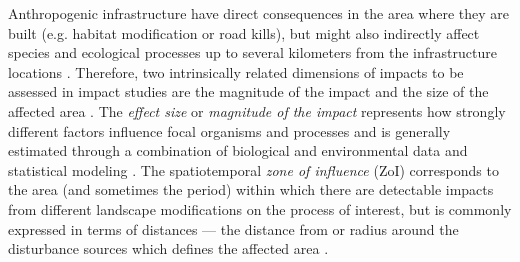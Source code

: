 \documentclass[titlepage]{article}
\begin{document}
Anthropogenic infrastructure have direct consequences in the area where they are built (e.g. habitat modification or road kills), but might also indirectly affect species and ecological processes up to several kilometers from the infrastructure locations \citep[e.g. reducing the probability of animal occurrence][]{johnson_cumulative_2005,torres_assessing_2016}. Therefore, two intrinsically related dimensions of impacts to be assessed in impact studies are the magnitude of the impact and the size of the affected area \citep[Box 1; ][]{naugle_unifying_2011}. The \textit{effect size} or \textit{magnitude of the impact} represents how strongly different factors influence focal organisms and processes and is generally estimated through a combination of biological and environmental data and statistical modeling \citep[Box 1;][]{polfus_identifying_2011}. The spatiotemporal \textit{zone of influence} (ZoI) 
corresponds to the area (and sometimes the period) within which there are detectable impacts from different landscape modifications on the process of interest, but is commonly expressed in terms of distances --- the distance from or radius around the disturbance sources which defines the affected area \citep[Box 1;][]{ boulanger_estimating_2012}. 
\end{document}
